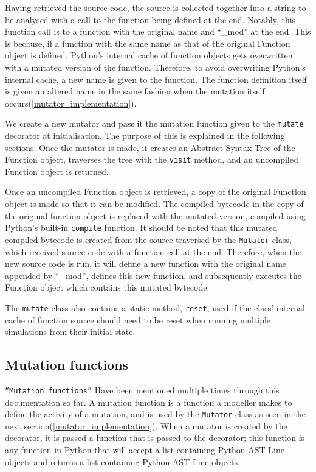 Having retrieved the source code, the source is collected together into a string to be analysed with a call to the function being defined at the end. Notably, this function call is to a function with the original name and ``\_mod'' at the end. This is because, if a function with the same name as that of the original Function object is defined, Python's internal cache of function objects gets overwritten with a mutated version of the function. Therefore, to avoid overwriting Python's internal cache, a new name is given to the function. The function definition itself is given an altered name in the same fashion when the mutation itself occurs(\cref{mutator_implementation}). \par

We create a new mutator and pass it the mutation function given to the \texttt{mutate} decorator at initialisation. The purpose of this is explained in the following sections. Once the mutator is made, it creates an Abstract Syntax Tree of the Function object, traverses the tree with the \texttt{visit} method, and an uncompiled Function object is returned. \par

Once an uncompiled Function object is retrieved, a copy of the original Function object is made so that it can be modified. The compiled bytecode in the copy of the original function object is replaced with the mutated version, compiled using Python's built-in \texttt{compile} function. It should be noted that this mutated compiled bytecode is created from the source traversed by the \texttt{Mutator} class, which received source code with a function call at the end. Therefore, when the new source code is run, it will define a new function with the original name appended by ``\_mod'', defines this new function, and subsequently executes the Function object which contains this mutated bytecode. \par

The \texttt{mutate} class also contains a static method, \texttt{reset}, used if the class' internal cache of function source should need to be reset when running multiple simulations from their initial state. \par

\subsection{Mutation functions}
\label{mutation_function_explanation}
\texttt{``Mutation functions''} Have been mentioned multiple times through this documentation so far. A mutation function is a function a modeller makes to define the activity of a mutation, and is used by the \texttt{Mutator} class as seen in the next section(\cref{mutator_implementation}). When a mutator is created by the decorator, it is passed a function that is passed to the decorator; this function is any function in Python that will accept a list containing Python AST Line objects and returns a list containing Python AST Line objects. \par

